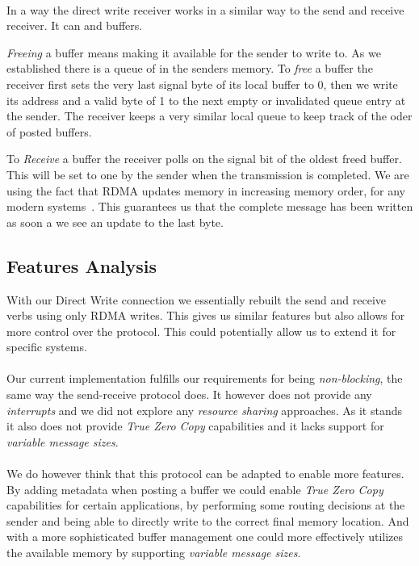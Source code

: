 \paragraph{} In a way the direct write receiver works in a similar way to the send and receive receiver. It can  and 
 buffers. 

\emph{Freeing} a buffer means making it available for the sender to write to. As we established  
there is a queue of  in the senders memory. To \emph{free} a buffer the receiver first sets the very last 
signal byte of its local buffer to 0, then we write its address and a valid byte of 1 to the next empty or 
invalidated queue entry at the sender. The receiver keeps a very similar local queue to keep track of the oder of 
posted buffers.

To \emph{Receive} a buffer the receiver polls on the signal bit of the oldest freed buffer. This will be set
to one by the sender when the transmission is completed. We are using the fact that RDMA updates memory in increasing memory 
order, for any modern systems~\cite{herd, farm}. This guarantees us that the complete message has been written as soon a we
see an update to the last byte.

\subsection{Features Analysis}

With our Direct Write connection we essentially rebuilt the send and receive verbs using only RDMA writes. This gives us 
similar features but also allows for more control over the protocol. This could potentially allow us to extend it for 
specific systems.

\paragraph{} Our current implementation fulfills our requirements for being \emph{non-blocking}, the same way the send-receive
protocol does. It however does not provide any \emph{interrupts} and we did not explore any \emph{resource sharing} approaches.
As it stands it also does not provide \emph{True Zero Copy} capabilities and it lacks support for 
\emph{variable message sizes}.


\paragraph{} We do however think that this protocol can be adapted to enable more features. By adding metadata when posting a
buffer we could enable \emph{True Zero Copy} capabilities for certain applications, by performing some routing decisions at
the sender and being able to directly write to the correct final memory location.
And with a more sophisticated buffer management one could more effectively utilizes the available memory by supporting 
\emph{variable message sizes}.



